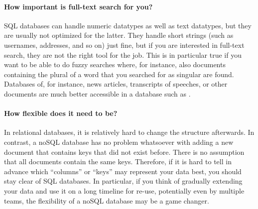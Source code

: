 \paragraph{How important is full-text search for you?} SQL databases can handle numeric datatypes as well as text datatypes, but they are usually not optimized for the latter. They handle short strings (such as usernames, addresses, and so on) just fine, but if you are interested in full-text search, they are not the right tool for the job. This is in particular true if you want to be able to do fuzzy searches where, for instance, also documents containing the plural of a word that you searched for as singular are found. Databases of, for instance, news articles, transcripts of speeches, or other documents are much better accessible in a database such as .


\paragraph{How flexible does it need to be?} In relational databases, it is relatively hard to change the structure afterwards. In contrast, a noSQL database has no problem whatsoever with adding a new document that contains keys that did not exist before. There is no assumption that all documents contain the same keys. Therefore, if it is hard to tell in advance which ``columns'' or ``keys'' may represent your data best, you should stay clear of SQL databases. In particular, if you think of gradually extending your data and use it on a long timeline for re-use, potentially even by multiple teams, the flexibility of a noSQL database may be a game changer.
